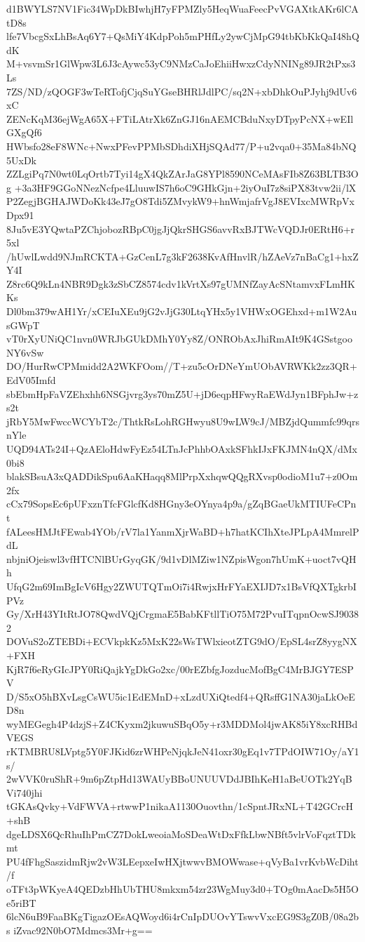 d1BWYLS7NV1Fic34WpDkBIwhjH7yFPMZly5HeqWuaFeecPvVGAXtkAKr6lCAtD8s
lfe7VbcgSxLhBsAq6Y7+QsMiY4KdpPoh5mPHfLy2ywCjMpG94tbKbKkQaI48hQdK
M+vsvmSr1GlWpw3L6J3cAywc53yC9NMzCaJoEhiiHwxzCdyNNINg89JR2tPxs3Ls
7ZS/ND/zQOGF3wTeRTofjCjqSuYGseBHRlJdlPC/sq2N+xbDhkOuPJyhj9dUv6xC
ZENcKqM36ejWgA65X+FTiLAtrXk6ZnGJ16nAEMCBduNxyDTpyPcNX+wEIlGXgQf6
HWbsfo28eF8WNc+NwxPFevPPMbSDhdiXHjSQAd77/P+u2vqa0+35Ma84bNQ5UxDk
ZZLgiPq7N0wt0LqOrtb7Tyi14gX4QkZArJaG8YPl8590NCeMAsFIb8Z63BLTB3Og
+3a3HF9GGoNNezNcfpe4LluuwIS7h6oC9GHkGjn+2iyOuI7z8siPX83tvw2ii/lX
P2ZegjBGHAJWDoKk43eJ7gO8Tdi5ZMvykW9+hnWmjafrVgJ8EVIxcMWRpVxDpx91
8Ju5vE3YQwtaPZChjobozRBpC0jgJjQkrSHGS6avvRxBJTWcVQDJr0ERtH6+r5xl
/hUwlLwdd9NJmRCKTA+GzCenL7g3kF2638KvAfHnvlR/hZAeVz7nBaCg1+hxZY4I
Z8rc6Q9kLn4NBR9Dgk3zSbCZ8574cdv1kVrtXs97gUMNfZayAcSNtamvxFLmHKKs
Dl0bm379wAH1Yr/xCEIuXEu9jG2vJjG30LtqYHx5y1VHWxOGEhxd+m1W2AusGWpT
vT0rXyUNiQC1nvn0WRJbGUkDMhY0Yy8Z/ONRObAxJhiRmAIt9K4GSstgooNY6vSw
DO/HurRwCPMmidd2A2WKFOom//T+zu5cOrDNeYmUObAVRWKk2zz3QR+EdV05Imfd
sbEbmHpFaVZEhxhh6NSGjvrg3ys70mZ5U+jD6eqpHFwyRaEWdJyn1BFphJw+zs2t
jRbY5MwFwccWCYbT2c/ThtkRsLohRGHwyu8U9wLW9cJ/MBZjdQummfc99qrsnYle
UQD94ATs24I+QzAEloHdwFyEz54LTnJcPhhbOAxkSFhkIJxFKJMN4nQX/dMx0bi8
blakSBsuA3xQADDikSpu6AaKHaqq8MlPrpXxhqwQQgRXvsp0odioM1u7+z0Om2fx
cCx79SopsEc6pUFxznTfcFGlcfKd8HGny3eOYnya4p9a/gZqBGaeUkMTIUFeCPnt
fALeesHMJtFEwab4YOb/rV7la1YanmXjrWaBD+h7hatKCIhXteJPLpA4MmrelPdL
nbjniOjeiswl3vfHTCNlBUrGyqGK/9d1vDlMZiw1NZpisWgon7hUmK+uoct7vQHh
UfqG2m69ImBgIcV6Hgy2ZWUTQTmOi7i4RwjxHrFYaEXIJD7x1BsVfQXTgkrbIPVz
Gy/XrH43YItRtJO78QwdVQjCrgmaE5BabKFtllTiO75M72PvuITqpnOcwSJ90382
DOVuS2oZTEBDi+ECVkpkKz5MxK22sWsTWlxieotZTG9dO/EpSL4srZ8yygNX+FXH
KjR7f6eRyGIcJPY0RiQajkYgDkGo2xc/00rEZbfgJozducMofBgC4MrBJGY7ESPV
D/S5xO5hBXvLsgCsWU5ic1EdEMnD+xLzdUXiQtedf4+QRsffG1NA30jaLkOeED8n
wyMEGegh4P4dzjS+Z4CKyxm2jkuwuSBqO5y+r3MDDMol4jwAK85iY8xcRHBdVEGS
rKTMBRU8LVptg5Y0FJKid6zrWHPeNjqkJeN41oxr30gEq1v7TPdOIW71Oy/aY1s/
2wVVK0ruShR+9m6pZtpHd13WAUyBBoUNUUVDdJBIhKeH1aBeUOTk2YqBVi740jhi
tGKAsQvky+VdFWVA+rtwwP1nikaA1130Ouovthn/1cSpntJRxNL+T42GCrcH+shB
dgeLDSX6QcRhuIhPmCZ7DokLweoiaMoSDeaWtDxFfkLbwNBft5vlrVoFqztTDkmt
PU4fFhgSaszidmRjw2vW3LEepxeIwHXjtwwvBMOWwase+qVyBa1vrKvbWcDiht/f
oTFt3pWKyeA4QEDzbHhUbTHU8mkxm54zr23WgMuy3d0+TOg0mAacDs5H5Oe5riBT
6lcN6uB9FaaBKgTigazOEsAQWoyd6i4rCnIpDUOvYTswvVxcEG9S3gZ0B/08a2bs
iZvac92N0bO7Mdmcs3Mr+g==
